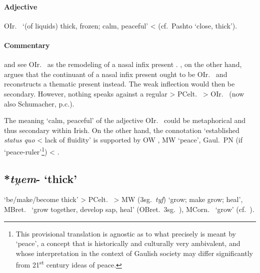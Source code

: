 \documentclass[output=paper,colorlinks,citecolor=brown]{langscibook}
\begin{document}
\paragraph*{Adjective}

OIr.\   ‘(of liquids) thick, frozen; calm, peaceful’ <  (cf.\ Pashto  ‘close, thick’).

\paragraph*{Commentary} 

\citet[469--470 and 474--475]{McCone1998} and  see OIr.\   as the remodeling of a nasal infix present  . \citet[615--616]{Schumacher2004}, on the other hand, argues that the continuant of a nasal infix present  ought to be OIr.\   and reconstructs a thematic present  instead. The weak inflection would then be secondary. However, nothing speaks against a regular   > PCelt.\  > OIr.\   (now also Schumacher, p.c.). 

The meaning ‘calm, peaceful’ of the adjective OIr.\   could be metaphorical and thus secondary within Irish. On the other hand, the connotation ‘established \textit{status quo} < lack of fluidity’ is supported by OW , MW  ‘peace’, Gaul.\ PN  (if ‘peace-ruler’\footnote{This provisional translation is agnostic as to what precisely is meant by ‘peace’, a concept that is historically and culturally very ambivalent, and whose interpretation in the context of Gaulish society may differ significantly from 21\textsuperscript{st} century ideas of peace.}) < .

\subsection{*\textit{tu̯em}- ‘thick’}
\label{sec:stativethick}

 ‘be/make/become thick’ > PCelt.\  > MW  (3sg.\ \textit{tyf}) ‘grow; make grow; heal’, MBret.\  ‘grow together, develop sap, heal’ (OBret.\ 3sg.\ ), MCorn.\  ‘grow’ (cf.\ \citealt[646--648]{Schumacher2004}).
\end{document}
